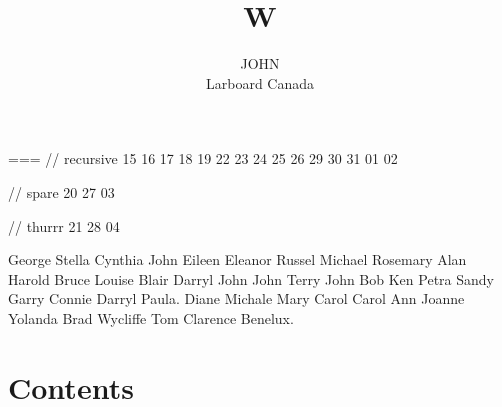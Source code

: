 \documentclass{textbook}
\title{W}
\author{
  \parbox{0.3\linewidth}{\centering JOHN\\Larboard Canada}
  }
\begin{document}
\maketitle

                                                        ===
// recursive
15 16 17 18 19
22 23 24 25 26
29 30 31 01 02

// spare
20
27
03

// thurrr
21
28
04

George Stella Cynthia John Eileen Eleanor Russel Michael Rosemary Alan Harold Bruce Louise Blair Darryl John John Terry John Bob Ken Petra Sandy Garry Connie Darryl Paula. Diane Michale Mary Carol Carol Ann Joanne Yolanda Brad Wycliffe Tom Clarence Benelux.

\section{Contents}
\end{document}

